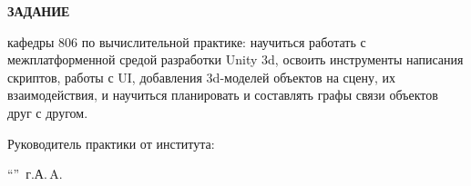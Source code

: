 \begin{center}
\bfseries{\large ЗАДАНИЕ}
\end{center}

кафедры 806 по вычислительной практике: научиться работать с межплатформенной средой разработки Unity 3d, освоить инструменты написания скриптов, работы с UI, добавления 3d-моделей объектов на сцену, их взаимодействия, и научиться планировать и составлять графы связи объектов друг с другом.

\vspace*{\fill}
Руководитель практики от института:

\vspace{5pt}
\enquote{\hspace{0.5cm}}  \the\year\,г. А.\,A. 
\pagebreak
